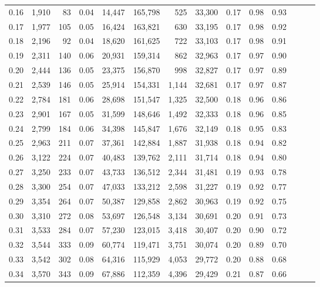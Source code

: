 \begin{tabular}{rrrrrrrrrrrrrr}
0.16 &  1,910 &   83 &  0.04 &   14,447 &  165,798 &     525 &  33,300 &  0.17 &  0.98 &      0.93 \\
0.17 &  1,977 &  105 &  0.05 &   16,424 &  163,821 &     630 &  33,195 &  0.17 &  0.98 &      0.92 \\
0.18 &  2,196 &   92 &  0.04 &   18,620 &  161,625 &     722 &  33,103 &  0.17 &  0.98 &      0.91 \\
0.19 &  2,311 &  140 &  0.06 &   20,931 &  159,314 &     862 &  32,963 &  0.17 &  0.97 &      0.90 \\
0.20 &  2,444 &  136 &  0.05 &   23,375 &  156,870 &     998 &  32,827 &  0.17 &  0.97 &      0.89 \\
0.21 &  2,539 &  146 &  0.05 &   25,914 &  154,331 &   1,144 &  32,681 &  0.17 &  0.97 &      0.87 \\
0.22 &  2,784 &  181 &  0.06 &   28,698 &  151,547 &   1,325 &  32,500 &  0.18 &  0.96 &      0.86 \\
0.23 &  2,901 &  167 &  0.05 &   31,599 &  148,646 &   1,492 &  32,333 &  0.18 &  0.96 &      0.85 \\
0.24 &  2,799 &  184 &  0.06 &   34,398 &  145,847 &   1,676 &  32,149 &  0.18 &  0.95 &      0.83 \\
0.25 &  2,963 &  211 &  0.07 &   37,361 &  142,884 &   1,887 &  31,938 &  0.18 &  0.94 &      0.82 \\
0.26 &  3,122 &  224 &  0.07 &   40,483 &  139,762 &   2,111 &  31,714 &  0.18 &  0.94 &      0.80 \\
0.27 &  3,250 &  233 &  0.07 &   43,733 &  136,512 &   2,344 &  31,481 &  0.19 &  0.93 &      0.78 \\
0.28 &  3,300 &  254 &  0.07 &   47,033 &  133,212 &   2,598 &  31,227 &  0.19 &  0.92 &      0.77 \\
0.29 &  3,354 &  264 &  0.07 &   50,387 &  129,858 &   2,862 &  30,963 &  0.19 &  0.92 &      0.75 \\
0.30 &  3,310 &  272 &  0.08 &   53,697 &  126,548 &   3,134 &  30,691 &  0.20 &  0.91 &      0.73 \\
0.31 &  3,533 &  284 &  0.07 &   57,230 &  123,015 &   3,418 &  30,407 &  0.20 &  0.90 &      0.72 \\
0.32 &  3,544 &  333 &  0.09 &   60,774 &  119,471 &   3,751 &  30,074 &  0.20 &  0.89 &      0.70 \\
0.33 &  3,542 &  302 &  0.08 &   64,316 &  115,929 &   4,053 &  29,772 &  0.20 &  0.88 &      0.68 \\
0.34 &  3,570 &  343 &  0.09 &   67,886 &  112,359 &   4,396 &  29,429 &  0.21 &  0.87 &      0.66 \\

\end{tabular}
